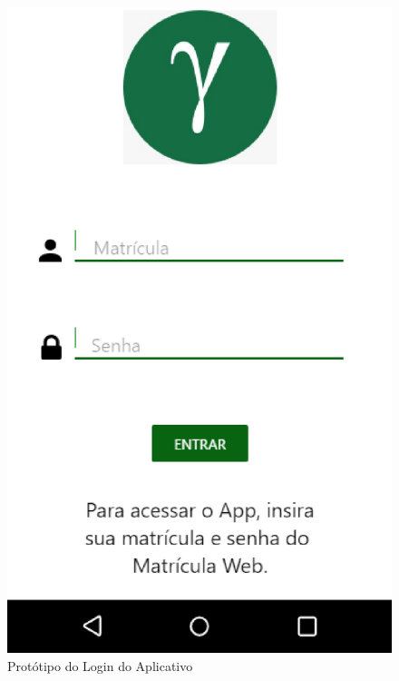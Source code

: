\begin{figure}[!h]
  \centering
  \includegraphics[keepaspectratio=true,scale=0.6]{figuras/prot-0.eps}
  \caption{Protótipo do Login do Aplicativo}
\end{figure}
